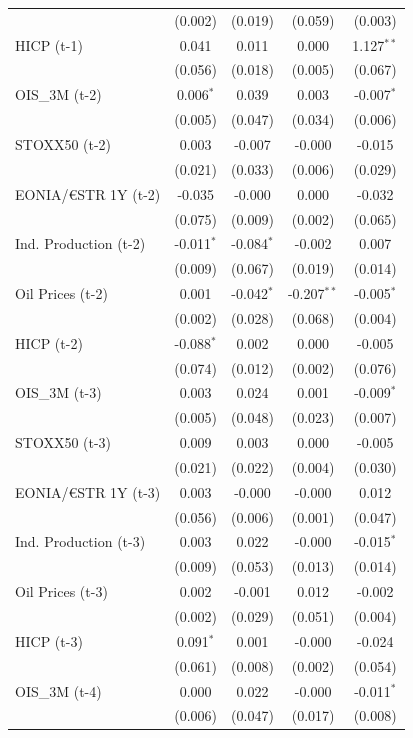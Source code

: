 \begin{longtable}[t]{lcccc}
 & (0.002) & (0.019) & (0.059) & (0.003)\\
HICP (t-1) & 0.041 & 0.011 & 0.000 & 1.127$^{**}$\\
 & (0.056) & (0.018) & (0.005) & (0.067)\\
OIS\_3M (t-2) & 0.006$^{*}$ & 0.039 & 0.003 & -0.007$^{*}$\\
 & (0.005) & (0.047) & (0.034) & (0.006)\\
STOXX50 (t-2) & 0.003 & -0.007 & -0.000 & -0.015\\
 & (0.021) & (0.033) & (0.006) & (0.029)\\
EONIA/€STR 1Y (t-2) & -0.035 & -0.000 & 0.000 & -0.032\\
 & (0.075) & (0.009) & (0.002) & (0.065)\\
Ind. Production (t-2) & -0.011$^{*}$ & -0.084$^{*}$ & -0.002 & 0.007\\
 & (0.009) & (0.067) & (0.019) & (0.014)\\
Oil Prices (t-2) & 0.001 & -0.042$^{*}$ & -0.207$^{**}$ & -0.005$^{*}$\\
 & (0.002) & (0.028) & (0.068) & (0.004)\\
HICP (t-2) & -0.088$^{*}$ & 0.002 & 0.000 & -0.005\\
 & (0.074) & (0.012) & (0.002) & (0.076)\\
OIS\_3M (t-3) & 0.003 & 0.024 & 0.001 & -0.009$^{*}$\\
 & (0.005) & (0.048) & (0.023) & (0.007)\\
STOXX50 (t-3) & 0.009 & 0.003 & 0.000 & -0.005\\
 & (0.021) & (0.022) & (0.004) & (0.030)\\
EONIA/€STR 1Y (t-3) & 0.003 & -0.000 & -0.000 & 0.012\\
 & (0.056) & (0.006) & (0.001) & (0.047)\\
Ind. Production (t-3) & 0.003 & 0.022 & -0.000 & -0.015$^{*}$\\
 & (0.009) & (0.053) & (0.013) & (0.014)\\
Oil Prices (t-3) & 0.002 & -0.001 & 0.012 & -0.002\\
 & (0.002) & (0.029) & (0.051) & (0.004)\\
HICP (t-3) & 0.091$^{*}$ & 0.001 & -0.000 & -0.024\\
 & (0.061) & (0.008) & (0.002) & (0.054)\\
OIS\_3M (t-4) & 0.000 & 0.022 & -0.000 & -0.011$^{*}$\\
 & (0.006) & (0.047) & (0.017) & (0.008)\\

\end{longtable}
